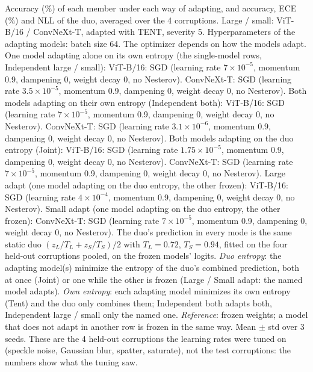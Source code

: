 \begin{table}[t]
    \centering
    \small
    \caption{Accuracy (\%) of each member under each way of adapting, and accuracy, ECE (\%) and NLL of the duo, averaged over the 4 corruptions. Large / small: ViT-B/16 / ConvNeXt-T, adapted with TENT, severity 5. Hyperparameters of the adapting models: batch size 64. The optimizer depends on how the models adapt. One model adapting alone on its own entropy (the single-model rows, Independent large / small): ViT-B/16: SGD (learning rate $7 \times 10^{-5}$, momentum 0.9, dampening 0, weight decay 0, no Nesterov). ConvNeXt-T: SGD (learning rate $3.5 \times 10^{-5}$, momentum 0.9, dampening 0, weight decay 0, no Nesterov). Both models adapting on their own entropy (Independent both): ViT-B/16: SGD (learning rate $7 \times 10^{-5}$, momentum 0.9, dampening 0, weight decay 0, no Nesterov). ConvNeXt-T: SGD (learning rate $3.1 \times 10^{-6}$, momentum 0.9, dampening 0, weight decay 0, no Nesterov). Both models adapting on the duo entropy (Joint): ViT-B/16: SGD (learning rate $1.75 \times 10^{-5}$, momentum 0.9, dampening 0, weight decay 0, no Nesterov). ConvNeXt-T: SGD (learning rate $7 \times 10^{-5}$, momentum 0.9, dampening 0, weight decay 0, no Nesterov). Large adapt (one model adapting on the duo entropy, the other frozen): ViT-B/16: SGD (learning rate $4 \times 10^{-4}$, momentum 0.9, dampening 0, weight decay 0, no Nesterov). Small adapt (one model adapting on the duo entropy, the other frozen): ConvNeXt-T: SGD (learning rate $7 \times 10^{-5}$, momentum 0.9, dampening 0, weight decay 0, no Nesterov). The duo's prediction in every mode is the same static duo $(z_L / T_L + z_S / T_S) / 2$ with $T_L = 0.72$, $T_S = 0.94$, fitted on the four held-out corruptions pooled, on the frozen models' logits. \emph{Duo entropy}: the adapting model(s) minimize the entropy of the duo's combined prediction, both at once (Joint) or one while the other is frozen (Large / Small adapt: the named model adapts). \emph{Own entropy}: each adapting model minimizes its own entropy (Tent) and the duo only combines them; Independent both adapts both, Independent large / small only the named one. \emph{Reference}: frozen weights; a model that does not adapt in another row is frozen in the same way. Mean $\pm$ std over 3 seeds. These are the 4 held-out corruptions the learning rates were tuned on (speckle noise, Gaussian blur, spatter, saturate), not the test corruptions: the numbers show what the tuning saw.}

\end{table}
